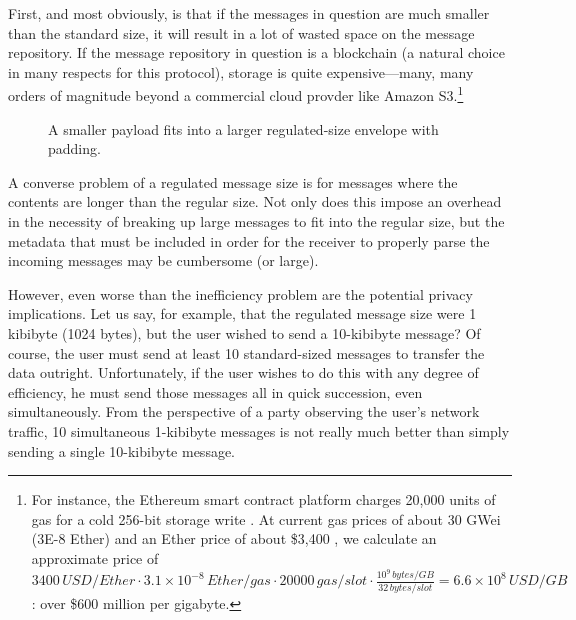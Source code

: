 First, and most obviously, is that if the messages in question are much smaller than the standard size, it will result in a lot of wasted space on the message repository. If the message repository in question is a blockchain (a natural choice in many respects for this protocol), storage is quite expensive---many, many orders of magnitude beyond a commercial cloud provder like Amazon S3.\footnote{For instance, the Ethereum smart contract platform  charges 20,000 units of gas for a cold 256-bit storage write \parencite[][Appendix G]{wood_ethereum_2025}. At current gas prices of about 30 GWei (3E-8 Ether) \parencite{etherscanio_gastracker} and an Ether price of about \$3,400 \parencite{coingecko_ethereum_2025}, we calculate an approximate price of $3400 \si{\,USD\per Ether} \cdot 3.1 \times 10^{-8} \si{\,Ether\per gas} \cdot 20000 \si{\,gas\per slot} \cdot \frac{10^9 \si{\,bytes\per GB}}{32 \si{\,bytes\per slot}} = 6.6 \times 10^8 \si{\,USD\per GB}$: over \$600 million per gigabyte.}

\begin{figure}[h!]
    \centering
    \caption{A smaller payload fits into a larger regulated-size envelope with padding.}
    \label{fig:payload_size}
\end{figure}

A converse problem of a regulated message size is for messages where the contents are longer than the regular size. Not only does this impose an overhead in the necessity of breaking up large messages to fit into the regular size, but the metadata that must be included in order for the receiver to properly parse the incoming messages may be cumbersome (or large).

However, even worse than the inefficiency problem are the potential privacy implications. Let us say, for example, that the regulated message size were 1 kibibyte (1024 bytes), but the user wished to send a 10-kibibyte message? Of course, the user must send at least 10 standard-sized messages to transfer the data outright. Unfortunately, if the user wishes to do this with any degree of efficiency, he must send those messages all in quick succession, even simultaneously. From the perspective of a party observing the user's network traffic, 10 simultaneous 1-kibibyte messages is not really much better than simply sending a single 10-kibibyte message.

